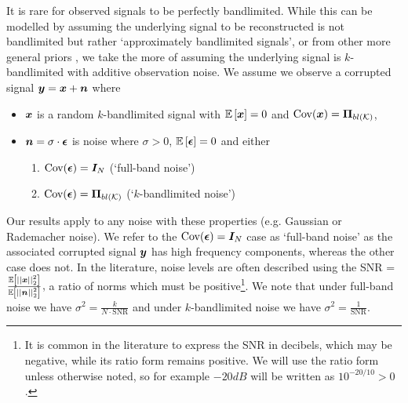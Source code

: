 

It is rare for observed signals to be perfectly bandlimited{\color{black}. While this can be modelled by assuming the underlying signal to be reconstructed is not bandlimited but rather} `approximately bandlimited signals'\cite{chen2016signal, lin2019active}, or from other more general priors \cite{tanaka2020generalized, hara2022sampling}, we take the more  of assuming {\color{black}the underlying signal is $k$-bandlimited} with additive observation noise. We assume we observe a corrupted signal $\bm{y} = \bm{x} + \bm{n}$ %
where
\begin{itemize}
    \item $\bm{x}$ is a random $k$-bandlimited signal with $\expect{\vect{x}} = 0$ and $\text{Cov}(\vect{x}) = \projbl$,
    \item $\bm{n} = \sigma \cdot \bm{\epsilon}$ is noise where $\sigma > 0$, $\expect{\vect{\epsilon}} = 0$ and either
    {\color{black}
    \begin{enumerate}
        \item $\text{Cov}(\bm{\epsilon}) = \bm{I}_{N}$ (`full-band noise')
        \item $\text{Cov}(\vect{\epsilon}) = \projbl $  (`$k$-bandlimited noise')
    \end{enumerate}
    }
\end{itemize}
{\color{black} Our results apply to any noise with these properties (e.g. Gaussian or Rademacher noise).}
We refer to the $\text{Cov}(\bm{\epsilon}) = \bm{I}_{N}$ case as `full-band noise' as the associated corrupted signal $\bm{y}$ has high frequency components, whereas the other case does not. In the literature, noise levels are often described using the SNR = $\frac{\expect{\sqnormvec{ \vect{x} }}}{\expect{\sqnormvec{\vect{n}}}}$, {\color{black} a ratio of norms which must be positive\footnote{It is common in the literature to express the SNR in decibels, which may be negative, while its ratio form remains positive. We will use the ratio form unless otherwise noted, so for example $-20dB$ will be written as $10^{-20/10}  > 0$.}. We note that under full-band noise we have $\sigma^{2} = \frac{k}{N \cdot \text{SNR}}$ and under $k$-bandlimited noise we have $\sigma^{2} = \frac{1}{\text{SNR}}$.} 

